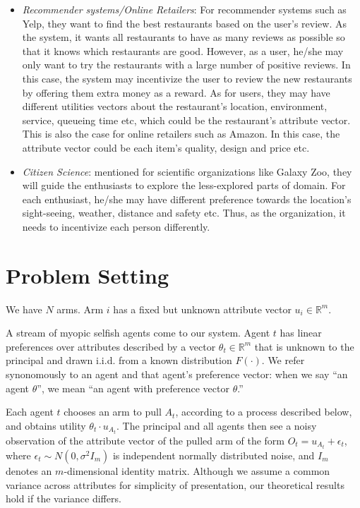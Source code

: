 \documentclass{article}
\begin{document}
\begin{itemize}
\item \textit{Recommender systems/Online Retailers}: For recommender systems such as Yelp, they want to find the best restaurants based on the user's review. As the system, it wants all restaurants to have as many reviews as possible so that it knows which restaurants are good. However, as a user, he/she may only want to try the restaurants with a large number of positive reviews. In this case, the system may incentivize the user to review the new restaurants by offering them extra money as a reward. As for users, they may have different utilities vectors about the restaurant's location, environment, service, queueing time etc, which could be the restaurant's attribute vector. This is also the case for online retailers such as Amazon. In this case, the attribute vector could be each item's quality, design and price etc.
\item \textit{Citizen Science}:  \cite{frazier2014incentivizing} mentioned for scientific organizations like Galaxy Zoo, they will guide the enthusiasts to explore the less-explored parts of domain. For each enthusiast, he/she may have different preference towards the location's sight-seeing, weather, distance and safety etc. Thus, as the organization, it needs to incentivize each person differently. 
\end{itemize}




\section{Problem Setting}
\label{sec:prob}

We have $N$ arms. Arm $i$ has a fixed but unknown attribute vector $u_i\in \mathbb{R}^{m}$. 

A stream of myopic selfish agents come to our system.  Agent $t$ has linear preferences over attributes described by a vector $\theta_t \in \mathbb{R}^m$ that is unknown to the principal and drawn i.i.d. from a known distribution $F(\cdot)$. We refer synonomously to an agent and that agent's preference vector: when we say ``an agent $\theta$'', we mean ``an agent with preference vector $\theta$.''

Each agent $t$ chooses an arm to pull $A_t$, according to a process described below, and obtains utility $\theta_t \cdot u_{A_{t}}$.  The principal and all agents then see a noisy observation of the attribute vector of the pulled arm of the form $O_t=u_{A_{t}}+\epsilon_{t}$, where $\epsilon_t\sim N(0, \sigma^2 I_{m})$ is independent normally distributed noise, and $I_m$ denotes an $m$-dimensional identity matrix.  Although we assume a common variance across attributes for simplicity of presentation, our theoretical results hold if the variance differs.
\end{document}
